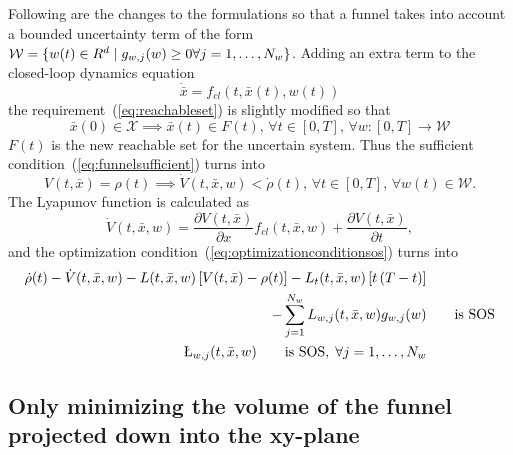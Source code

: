 Following are the changes to the formulations so that a funnel takes into
account a bounded uncertainty term of the form \(\mathcal{W} = \lbrace w(t) \in
  R^d \mid g_{w,j}(w) \geq 0 \forall j = 1,\ldots,N_w\rbrace\). Adding an extra term
to the closed-loop dynamics equation
\[
  \dot{\bar{x}} = f_{cl}(t, \bar{x}(t), w(t))
\]
the requirement~(\ref{eq:reachableset}) is slightly modified so that
\begin{equation}
  \label{eq:uncertain-reachableset}
  \bar{x}(0) \in \mathcal{X} \implies \bar{x}(t) \in F(t),\, \forall t \in
  [0,T], \, \forall w \colon [0,T] \rightarrow \mathcal{W}
\end{equation} 
\(F(t)\) is the new reachable set for the uncertain system. Thus the sufficient
condition~(\ref{eq:funnelsufficient}) turns into
\begin{equation}
  \label{eq:funneluncertain-sufficient}
  V(t,\bar{x}) = \rho(t) \implies \dot{V}(t,\bar{x},w) < \dot{\rho}(t), \, \forall t \in [0,T], \, \forall w(t) \in \mathcal{W}.
\end{equation}
The Lyapunov function is calculated as
\begin{equation}
  \dot{V}(t,\bar{x}, w) = \frac{\partial V(t,\bar{x})}{\partial x} f_{cl}(t,\bar{x},w) + \frac{\partial V(t,\bar{x})}{\partial t},
\end{equation}
and the optimization condition~(\ref{eq:optimizationconditionsos}) turns into
\begin{align}
  \label{eq:optimizationconditionuncertain}
  \dot{\rho}(t) - \dot{V}(t,\bar{x},w) - L(t,\bar{x},w) \left[ V(t,\bar{x}) - \rho(t) \right] - L_{t}(t,\bar{x},w)\left[ t\left( T - t \right) \right]  & \\
  - \sum_{j=1}^{N_{w}} L_{w,j}(t,\bar{x},w)g_{w,j}(w)& \qquad \text{is SOS}  \\
  \L_{w,j}(t,\bar{x},w) \qquad \text{is SOS}, \; \forall j = 1,\ldots,N_w
\end{align}

\subsection{Only minimizing the volume of the funnel projected down into the
  xy-plane}

